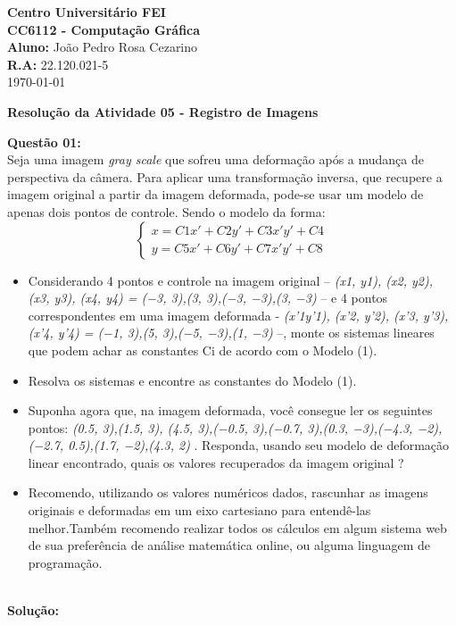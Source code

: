 \noindent \textbf{Centro Universitário FEI}\\
\noindent \textbf{CC6112 - Computação Gráfica}\\
\noindent \textbf{Aluno: } João Pedro Rosa Cezarino  \\ 
\noindent \textbf{R.A: } 22.120.021-5\\
\today
\\
\begin{center}
    \noindent \textbf{Resolução da Atividade 05 - Registro de Imagens}
\end{center}
\vspace{0.5cm}
\noindent\textbf{Questão 01:}\\
Seja uma imagem \emph{gray scale} que sofreu uma deformação após a mudança de perspectiva da câmera. Para aplicar uma transformação inversa, que recupere a imagem original a partir da imagem deformada, pode-se usar um modelo de apenas dois pontos de controle. Sendo o modelo da forma:
\[
\begin{cases}
x = C1x' + C2y' + C3x'y' + C4 \\
y = C5x' + C6y' + C7x'y' + C8
\end{cases}
\]
\begin{itemize}
    \item Considerando 4 pontos e controle na imagem original – \emph{(x1, y1), (x2, y2), (x3, y3), (x4, y4) = (−3, 3),(3, 3),(−3, −3),(3, −3) } – e 4 pontos correspondentes em uma imagem deformada - \emph{(x'1y'1), (x'2, y'2), (x'3, y'3), (x'4, y'4) = (−1, 3),(5, 3),(−5, −3),(1, −3) } –, monte os sistemas lineares que podem achar as constantes Ci de acordo com o Modelo (1). 
    \item Resolva os sistemas e encontre as constantes do Modelo (1). 
    \item Suponha agora que, na imagem deformada, você consegue ler os seguintes pontos: \emph{(0.5, 3),(1.5, 3), (4.5, 3),(−0.5, 3),(−0.7, 3),(0.3, −3),(−4.3, −2),(−2.7, 0.5),(1.7, −2),(4.3, 2) }. Responda, usando seu modelo de deformação linear encontrado, quais os valores recuperados da imagem original ? 
    \item Recomendo, utilizando os valores numéricos dados, rascunhar as imagens originais e deformadas em um eixo cartesiano para entendê-las melhor.Também recomendo realizar todos os cálculos em algum sistema web de sua preferência de análise matemática online, ou alguma linguagem de programação.
\end{itemize}
\\
\noindent\textbf{Solução:}
